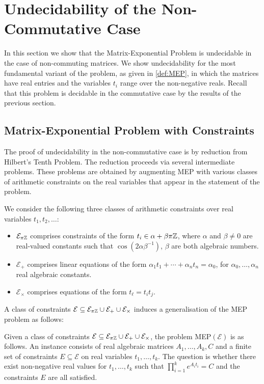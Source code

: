 \section{Undecidability of the Non-Commutative Case}
\label{sec:lics_encoding}

In this section we show that the Matrix-Exponential Problem is
undecidable in the case of non-commuting matrices.  We show
undecidability for the most fundamental variant of the problem, as
given in \cref{def:MEP}, in which the matrices have real
entries and the variables $t_{i}$ range over the non-negative reals.
Recall that this problem is decidable in the commutative case by the
results of the previous section.

\subsection{Matrix-Exponential Problem with Constraints}

The proof of undecidability in the non-commutative case is by
reduction from Hilbert's Tenth Problem.  The reduction proceeds via
several intermediate problems.  These problems are obtained by
augmenting MEP with various classes of arithmetic constraints on the
real variables that appear in the statement of the problem.

\begin{definition}
  We consider the following three classes of arithmetic constraints
  over real variables $t_1,t_2,\ldots$:
\begin{itemize}
\item $\mathcal{E}_{\pi\mathbb{Z}}$ comprises constraints of the form
  $t_{i}\in\alpha+\beta\pi\mathbb{Z}$, where $\alpha$ and $\beta\neq 0$
  are real-valued constants such that $\cos(2\alpha\beta^{-1})$,
  $\beta$ are both algebraic numbers.
\item $\mathcal{E}_{+}$ comprises linear equations of the form
  $\alpha_1 t_1 + \cdots + \alpha_n t_n = \alpha_0 $, for
  $\alpha_0,\ldots,\alpha_n$ real algebraic constants.
\item $\mathcal{E}_{\times}$ comprises equations of the form
  $t_{\ell} = t_{i} t_{j}$.
\end{itemize}
\end{definition}

A class of constraints $\mathcal{E} \subseteq \mathcal{E}_{\pi\mathbb{Z}} \cup
\mathcal{E}_{+}\cup \mathcal{E}_{\times}$
induces a generalisation of the MEP problem as follows:
\begin{definition}
  Given a class of constraints
  $\mathcal{E} \subseteq \mathcal{E}_{\pi\mathbb{Z}} \cup
  \mathcal{E}_{+}\cup \mathcal{E}_{\times}$,
  the problem MEP$(\mathcal{E})$ is as follows.  An instance consists
  of real algebraic matrices $A_1,\ldots,A_k,C$ and a finite set of
  constraints $E\subseteq\mathcal{E}$ on real variables
  $t_1,\ldots,t_k$.  The question is whether there exist non-negative
  real values for $t_1,\ldots,t_k$ such that
  $\prod_{i=1}^{k} e^{A_{i} t_{i}}=C$ and the constraints $E$ are all
  satisfied.
\label{def:contraintMEP}
\end{definition}


